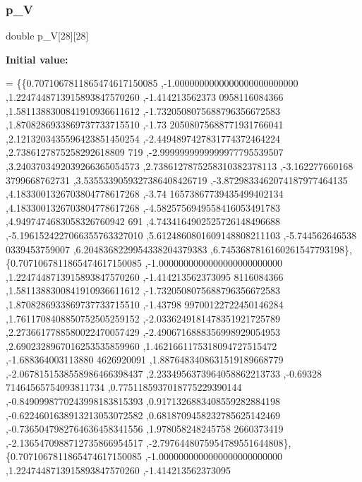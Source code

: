 \mbox{\label{a01002_a3e85a3e21bdbfabd25d6f58348485039}} 
\subsubsection{\texorpdfstring{p\+\_\+V}{p\_V}}
{\footnotesize\ttfamily double p\+\_\+V\mbox{[}28\mbox{]}\mbox{[}28\mbox{]}}

{\bfseries Initial value\+:}
\begin{DoxyCode}
= \{\{0.7071067811865474617150085 ,-1.0000000000000000000000000 ,1.2247448713915893847570260 ,-1.414213562373
      0958116084366 ,1.5811388300841910936611612 ,-1.7320508075688796356672583 ,1.8708286933869737733715510 ,-1.73
      20508075688771931766041 ,2.1213203435596423851450254 ,-2.4494897427831774372464224 ,2.7386127875258292618809
      719 ,-2.9999999999999977795539507 ,3.2403703492039266365054573 ,2.7386127875258310382378113 ,-3.162277660168
      3799668762731 ,3.5355339059327386408426719 ,-3.8729833462074187977464135 ,4.1833001326703804778617268 ,-3.74
      16573867739435499402134 ,4.1833001326703804778617268 ,-4.5825756949558416053491783 ,4.9497474683058326760942
      691 ,4.7434164902525726148496688 ,-5.1961524227066355763327010 ,5.6124860801609148808211103 ,-5.744562646538
      0339453759007 ,6.2048368229954338204379383 ,6.7453687816160261547793198\},
\{0.7071067811865474617150085 ,-1.0000000000000000000000000 ,1.2247448713915893847570260 ,-1.414213562373095
      8116084366 ,1.5811388300841910936611612 ,-1.7320508075688796356672583 ,1.8708286933869737733715510 ,-1.43798
      99700122722450146284 ,1.7611708408850752505259152 ,-2.0336249181478351921725789 ,2.2736617788580022470057429
       ,-2.4906716888356998929054953 ,2.6902328967016253535859960 ,1.4621661175318094727515472 ,-1.688364003113880
      4626920091 ,1.8876483408631519189668779 ,-2.0678151538558986466398437 ,2.2334956373964058862213733 ,-0.69328
      71464565754093811734 ,0.7751185937018775229390144 ,-0.8490998770243998183815393 ,0.9171326883408559282884198
       ,-0.6224601638913213053072582 ,0.6818709458232785625142469 ,-0.7365047982764636458341556 ,1.978058248245758
      2660373419 ,-2.1365470988712735866954517 ,-2.7976448075954789551644808\},
\{0.7071067811865474617150085 ,-1.0000000000000000000000000 ,1.2247448713915893847570260 ,-1.414213562373095

\end{DoxyCode}
